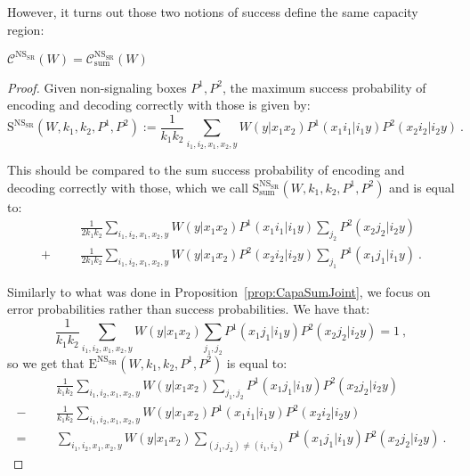 However, it turns out those two notions of success define the same capacity region:
\begin{proposition}
  \label{prop:NSCapaSumJoint}
  $\mathcal{C}^{\mathrm{NS}_{\mathrm{SR}}}(W) = \mathcal{C}_{\text{sum}}^{\mathrm{NS}_{\mathrm{SR}}}(W)$
\end{proposition}
\begin{proof}
  Given non-signaling boxes $P^1,P^2$, the maximum success probability of encoding and decoding correctly with those is given by:
\[ \mathrm{S}^{\mathrm{NS}_{\mathrm{SR}}}(W,k_1,k_2,P^1,P^2) := \frac{1}{k_1k_2} \sum_{i_1,i_2,x_1,x_2,y} W(y|x_1x_2)P^1(x_1i_1|i_1y)P^2(x_2i_2|i_2y) \ . \]

This should be compared to the sum success probability of encoding and decoding correctly with those, which we call $\mathrm{S}_{\text{sum}}^{\mathrm{NS}_{\mathrm{SR}}}(W,k_1,k_2,P^1,P^2)$ and is equal to:
\begin{equation}
  \begin{aligned}
    &&&\frac{1}{2k_1k_2} \sum_{i_1,i_2,x_1,x_2,y} W(y|x_1x_2)P^1(x_1i_1|i_1y)\sum_{j_2}P^2(x_2j_2|i_2y)\\
    + &&&\frac{1}{2k_1k_2} \sum_{i_1,i_2,x_1,x_2,y} W(y|x_1x_2)P^2(x_2i_2|i_2y)\sum_{j_1}P^1(x_1j_1|i_1y) \ .
  \end{aligned}
\end{equation}

Similarly to what was done in Proposition~\ref{prop:CapaSumJoint}, we focus on error probabilities rather than success probabilities. We have that:
\[ \frac{1}{k_1k_2}\sum_{i_1,i_2,x_1,x_2,y}W(y|x_1x_2)\sum_{j_1,j_2}P^1(x_1j_1|i_1y)P^2(x_2j_2|i_2y) = 1 \ ,\]
so we get that $\mathrm{E}^{\mathrm{NS}_{\mathrm{SR}}}(W,k_1,k_2,P^1,P^2)$ is equal to:
\begin{equation}
  \begin{aligned}
    &&&\frac{1}{k_1k_2} \sum_{i_1,i_2,x_1,x_2,y} W(y|x_1x_2)\sum_{j_1,j_2}P^1(x_1j_1|i_1y)P^2(x_2j_2|i_2y)\\
    - &&&\frac{1}{k_1k_2} \sum_{i_1,i_2,x_1,x_2,y} W(y|x_1x_2)P^1(x_1i_1|i_1y)P^2(x_2i_2|i_2y)\\
      = &&& \sum_{i_1,i_2,x_1,x_2,y} W(y|x_1x_2)\sum_{(j_1,j_2) \not= (i_1,i_2)}P^1(x_1j_1|i_1y)P^2(x_2j_2|i_2y) \ .
  \end{aligned}
\end{equation}


\end{proof}
